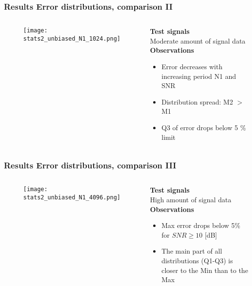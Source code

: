 \documentclass[11pt,aspectratio=169]{beamer}
\begin{document}
	\begin{frame}
		\frametitle{Results \textendash{} Error distributions, comparison II}
		\begin{columns}[t]
			\begin{RIPcolleft}
				\begin{figure}
					\texttt{[image: stats2\_unbiased\_N1\_1024.png]}
				\end{figure}
			\end{RIPcolleft}
			\begin{RIPcolright}
				\textbf{Test signals}\\
				Moderate amount of signal data\\
				\vspace*{.5em}
				\textbf{Observations}\\
				\begin{itemize}
					\item Error decreases with increasing period N1 and SNR
					\item Distribution spread: \hfill{} M2 $>$ M1
					\item Q3 of error drops below 5 \% limit
				\end{itemize}
			\end{RIPcolright}
		\end{columns}
	\end{frame}
	\begin{frame}
		\frametitle{Results \textendash{} Error distributions, comparison III}
		\begin{columns}[t]
			\begin{RIPcolleft}
				\begin{figure}
					\texttt{[image: stats2\_unbiased\_N1\_4096.png]}
				\end{figure}
			\end{RIPcolleft}
			\begin{RIPcolright}
				\textbf{Test signals}\\
				High amount of signal data\\
				\vspace*{.5em}
				\textbf{Observations}\\
				\begin{itemize}
					\item Max error drops below 5\% for $SNR \ge 10$ [dB]
					\item The main part of all distributions (Q1-Q3) is closer to the Min than to the Max
				\end{itemize}
			\end{RIPcolright}
		\end{columns}
	\end{frame}
\end{document}

